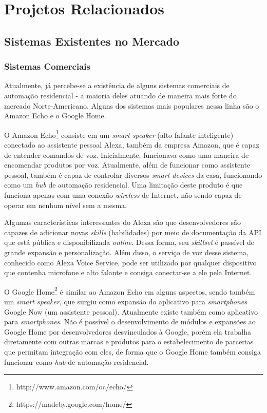 \chapter{Projetos Relacionados}

\section{Sistemas Existentes no Mercado}

\subsection{Sistemas Comerciais}
Atualmente, já percebe-se a existência de alguns sistemas comerciais de automação residencial - a maioria deles atuando de maneira mais forte do mercado Norte-Americano. Alguns dos sistemas mais populares nessa linha são o Amazon Echo e o Google Home.

O Amazon Echo\footnote{http://www.amazon.com/oc/echo/} consiste em um \textit{smart speaker} (alto falante inteligente) conectado ao assistente pessoal Alexa, também da empresa Amazon, que é capaz de entender comandos de voz. Inicialmente, funcionava como uma maneira de encomendar produtos por voz. Atualmente, além de funcionar como assistente pessoal, também é capaz de controlar diversos \textit{smart devices} da casa, funcionando como um \textit{hub} de automação residencial. Uma limitação deste produto é que funciona apenas com uma conexão \textit{wireless} de Internet, não sendo capaz de operar em nenhum nível sem a mesma.

Algumas características interessantes do Alexa são que desenvolvedores são capazes de adicionar novas \textit{skills} (habilidades) por meio de documentação da API que está pública e disponibilizada \textit{online}. Dessa forma, seu \textit{skillset} é passível de grande expansão e personalização. Além disso, o serviço de voz desse sistema, conhecido como Alexa Voice Service, pode ser utilizado por qualquer dispositivo que contenha microfone e alto falante e consiga conectar-se a ele pela Internet.

O Google Home\footnote{https://madeby.google.com/home/} é similar ao Amazon Echo em alguns aspectos, sendo também um \textit{smart speaker}, que surgiu como expansão do aplicativo para \textit{smartphones} Google Now (um assistente pessoal). Atualmente existe também como aplicativo para \textit{smartphones}. Não é possível o desenvolvimento de módulos e expansões ao Google Home por desenvolvedores desvinculados à Google, porém ela trabalha diretamente com outras marcas e produtos para o estabelecimento de parcerias que permitam integração com eles, de forma que o Google Home também consiga funcionar como \textit{hub} de automação residencial.

